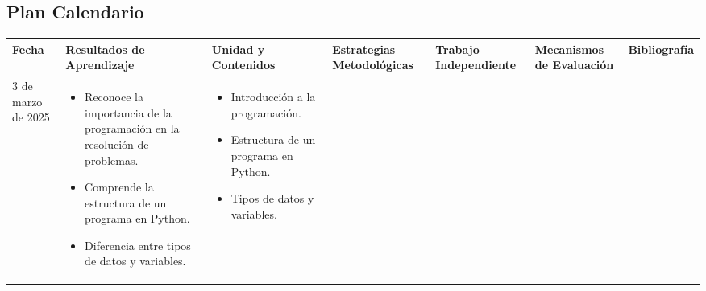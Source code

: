 \begin{landscape}
    \section{Plan Calendario}

    \begin{adjustbox}{width=1.3847\textwidth}
        \begin{tabular}{ | p{1.5cm} | p{5cm} | p{5cm} | p{3cm} | p{3cm} | p{3cm} | p{4cm} | }
            \hline
            \textbf{Fecha}     & \textbf{Resultados de Aprendizaje} & \textbf{Unidad y Contenidos} & \textbf{Estrategias Metodológicas} & \textbf{Trabajo Independiente} & \textbf{Mecanismos de Evaluación} & \textbf{Bibliografía} \\
            \hline
            3 de marzo de 2025 & \begin{minipage}
                                     [t]{5cm}
                                     \begin{itemize}
                    \item Reconoce la importancia de la programación en la resolución de problemas.
                    \item Comprende la estructura de un programa en Python.
                    \item Diferencia entre tipos de datos y variables.
                \end{itemize}
                                 \end{minipage}          & \begin{minipage}
                                                               [t]{5cm}
                                                               \begin{itemize}
                    \item Introducción a la programación.
                    \item Estructura de un programa en Python.
                    \item Tipos de datos y variables.
                \end{itemize}
                                                           \end{minipage}    & \begin{minipage}
                                                                                   [t]{3cm}
                                                                                   \begin{itemize}

\end{itemize}
\end{minipage}
\end{tabular}
\end{adjustbox}
\end{landscape}

